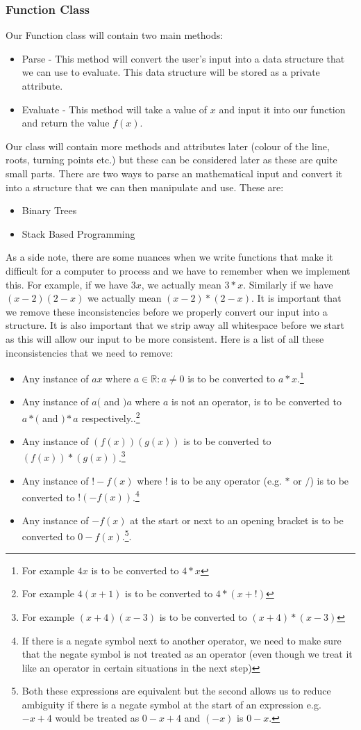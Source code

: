 \documentclass{report}
\begin{document}
\subsubsection{Function Class}	\label{funcClass}
Our Function class will contain two main methods:
\begin{itemize}
	\item Parse - This method will convert the user's input into a data structure that we can use to evaluate. This data structure will be stored as a private attribute.
	\item Evaluate - This method will take a value of $x$ and input it into our function and return the value $f(x)$.
\end{itemize}
Our class will contain more methods and attributes later (colour of the line, roots, turning points etc.) but these can be considered later as these are quite small parts.
There are two ways to parse an mathematical input and convert it into a structure that we can then manipulate and use. These are:
\begin{itemize}
	\item Binary Trees
	\item Stack Based Programming
\end{itemize}
As a side note, there are some nuances when we write functions that make it difficult for a computer to process and we have to remember when we implement this. For example, if we have $3x$, we actually mean $3*x$. Similarly if we have $(x-2)(2-x)$ we actually mean $(x-2)*(2-x)$. It is important that we remove these inconsistencies before we properly convert our input into a structure. It is also important that we strip away all whitespace before we start as this will allow our input to be more consistent. Here is a list of all these inconsistencies that we need to remove:
\begin{itemize}
	\item Any instance of $ax$ where $a \in  \mathbb{R} : a \neq 0$ is to be converted to $a*x$.\footnote{For example $4x$ is to be converted to $4*x$}
	\item Any instance of $a($ and $)a$ where $a$ is not an operator, is to be converted to $a*($ and $)*a$ respectively..\footnote{For example $4(x+1)$ is to be converted to $4*(x+!)$}
	\item Any instance of $(f(x))(g(x))$ is to be converted to $(f(x))*(g(x))$.\footnote{For example $(x+4)(x-3)$ is to be converted to $(x+4)*(x-3)$}
	\item Any instance of $!-f(x)$ where $!$ is to be any operator (e.g. $*$ or $/$) is to be converted to $! (-f(x))$.\footnote{If there is a negate symbol next to another operator, we need to make sure that the negate symbol is not treated as an operator (even though we treat it like an operator in certain situations in the next step)}
	\item Any instance of $-f(x)$ at the start or next to an opening bracket is to be converted to $0 - f(x)$.\footnote{Both these expressions are equivalent but the second allows us to reduce ambiguity if there is a negate symbol at the start of an expression e.g.\ $-x + 4$ would be treated as $0 - x + 4$ and $(-x)$ is $0-x$.}.
\end{itemize}
\newpage
\end{document}
